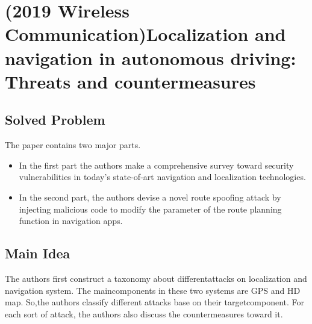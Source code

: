 \documentclass[11pt]{article}
\begin{document}
\section{(2019 Wireless Communication)Localization and navigation in autonomous driving: Threats and countermeasures}
\label{sec:org2c0331c}
\subsection{Solved Problem}
\label{sec:orgd229c9e}
The paper contains two major parts.
\begin{itemize}
\item In the first part the authors make a comprehensive survey toward security vulnerabilities in today's state-of-art navigation and localization technologies.
\item In the second part, the authors devise a novel route spoofing attack by injecting malicious code to modify the parameter of the route planning function in navigation apps.
\end{itemize}
\subsection{Main Idea}
\label{sec:org8a9e5ff}
The authors first construct a taxonomy about differentattacks on localization and navigation system. The maincomponents in these two systems are GPS and HD map. So,the authors classify different attacks base on their targetcomponent. For each sort of attack, the authors also discuss the countermeasures toward it.
\end{document}
